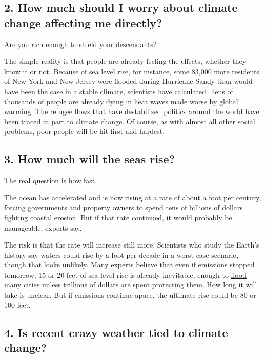 \hypertarget{2-how-much-should-i-worry-about-climate-change-affecting-me-directly}{%
\subsection{2. How much should I worry about climate change affecting me
directly?}\label{2-how-much-should-i-worry-about-climate-change-affecting-me-directly}}

Are you rich enough to shield your descendants?

The simple reality is that people are already feeling the effects,
whether they know it or not. Because of sea level rise, for instance,
some 83,000 more residents of New York and New Jersey were flooded
during Hurricane Sandy than would have been the case in a stable
climate, scientists have calculated. Tens of thousands of people are
already dying in heat waves made worse by global warming. The refugee
flows that have destabilized politics around the world have been traced
in part to climate change. Of course, as with almost all other social
problems, poor people will be hit first and hardest.

\hypertarget{3-how-much-will-the-seas-rise}{%
\subsection{3. How much will the seas
rise?}\label{3-how-much-will-the-seas-rise}}

The real question is how fast.

The ocean has accelerated and is now rising at a rate of about a foot
per century, forcing governments and property owners to spend tens of
billions of dollars fighting coastal erosion. But if that rate
continued, it would probably be manageable, experts say.

The risk is that the rate will increase still more. Scientists who study
the Earth's history say waters could rise by a foot per decade in a
worst-case scenario, though that looks unlikely. Many experts believe
that even if emissions stopped tomorrow, 15 or 20 feet of sea level rise
is already inevitable, enough to
\href{https://www.nytimes3xbfgragh.onion/2016/03/15/science/rising-sea-levels-global-warming-climate-change.html}{flood
many cities} unless trillions of dollars are spent protecting them. How
long it will take is unclear. But if emissions continue apace, the
ultimate rise could be 80 or 100 feet.

\hypertarget{4-is-recent-crazy-weather-tied-to-climate-change}{%
\subsection{4. Is recent crazy weather tied to climate
change?}\label{4-is-recent-crazy-weather-tied-to-climate-change}}

